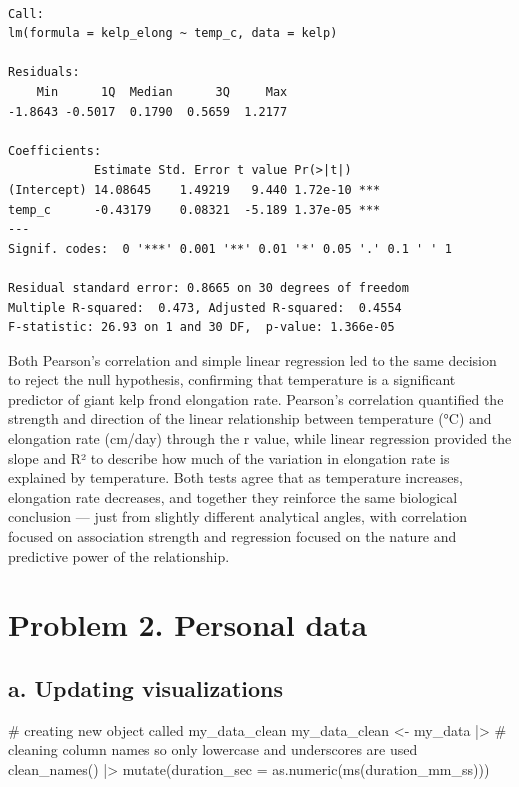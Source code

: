 \documentclass[
  letterpaper,
  DIV=11,
  numbers=noendperiod]{scrartcl}
\newenvironment{Shaded}{\begin{snugshade}}{\end{snugshade}}
\newcommand{\AttributeTok}[1]{\textcolor[rgb]{0.40,0.45,0.13}{#1}}
\newcommand{\CommentTok}[1]{\textcolor[rgb]{0.37,0.37,0.37}{#1}}
\newcommand{\FunctionTok}[1]{\textcolor[rgb]{0.28,0.35,0.67}{#1}}
\newcommand{\NormalTok}[1]{\textcolor[rgb]{0.00,0.23,0.31}{#1}}
\newcommand{\OtherTok}[1]{\textcolor[rgb]{0.00,0.23,0.31}{#1}}
\newcommand{\SpecialCharTok}[1]{\textcolor[rgb]{0.37,0.37,0.37}{#1}}
\begin{document}
\begin{verbatim}

Call:
lm(formula = kelp_elong ~ temp_c, data = kelp)

Residuals:
    Min      1Q  Median      3Q     Max 
-1.8643 -0.5017  0.1790  0.5659  1.2177 

Coefficients:
            Estimate Std. Error t value Pr(>|t|)    
(Intercept) 14.08645    1.49219   9.440 1.72e-10 ***
temp_c      -0.43179    0.08321  -5.189 1.37e-05 ***
---
Signif. codes:  0 '***' 0.001 '**' 0.01 '*' 0.05 '.' 0.1 ' ' 1

Residual standard error: 0.8665 on 30 degrees of freedom
Multiple R-squared:  0.473, Adjusted R-squared:  0.4554 
F-statistic: 26.93 on 1 and 30 DF,  p-value: 1.366e-05
\end{verbatim}

Both Pearson's correlation and simple linear regression led to the same
decision to reject the null hypothesis, confirming that temperature is a
significant predictor of giant kelp frond elongation rate. Pearson's
correlation quantified the strength and direction of the linear
relationship between temperature (°C) and elongation rate (cm/day)
through the r value, while linear regression provided the slope and R²
to describe how much of the variation in elongation rate is explained by
temperature. Both tests agree that as temperature increases, elongation
rate decreases, and together they reinforce the same biological
conclusion --- just from slightly different analytical angles, with
correlation focused on association strength and regression focused on
the nature and predictive power of the relationship.

\section{Problem 2. Personal data}\label{problem-2.-personal-data}

\subsection{a. Updating
visualizations}\label{a.-updating-visualizations}

\begin{Shaded}
\begin{Highlighting}[]
\CommentTok{\# creating new object called my\_data\_clean}
\NormalTok{my\_data\_clean }\OtherTok{\textless{}{-}}\NormalTok{ my\_data }\SpecialCharTok{|\textgreater{}}
\CommentTok{\# cleaning column names so only lowercase and underscores are used}
\FunctionTok{clean\_names}\NormalTok{() }\SpecialCharTok{|\textgreater{}}
  \FunctionTok{mutate}\NormalTok{(}\AttributeTok{duration\_sec =} \FunctionTok{as.numeric}\NormalTok{(}\FunctionTok{ms}\NormalTok{(duration\_mm\_ss)))}
\end{Highlighting}
\end{Shaded}
\end{document}

